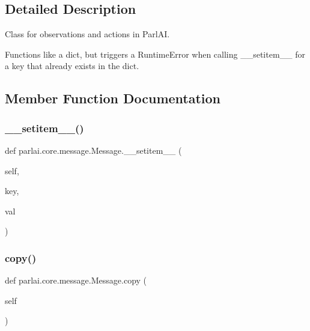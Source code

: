 \subsection{Detailed Description}
\begin{DoxyVerb}Class for observations and actions in ParlAI.

Functions like a dict, but triggers a RuntimeError when calling __setitem__ for a
key that already exists in the dict.
\end{DoxyVerb}
 

\subsection{Member Function Documentation}
\mbox{\label{classparlai_1_1core_1_1message_1_1Message_a2fd83603b06a7da7ab7fc99649d855f6}} 
\subsubsection{\texorpdfstring{\+\_\+\+\_\+setitem\+\_\+\+\_\+()}{\_\_setitem\_\_()}}
{\footnotesize\ttfamily def parlai.\+core.\+message.\+Message.\+\_\+\+\_\+setitem\+\_\+\+\_\+ (\begin{DoxyParamCaption}\item[{}]{self,  }\item[{}]{key,  }\item[{}]{val }\end{DoxyParamCaption})}

\mbox{\label{classparlai_1_1core_1_1message_1_1Message_a374ac4a5d73e853960cc0f964b73a7fd}} 
\subsubsection{\texorpdfstring{copy()}{copy()}}
{\footnotesize\ttfamily def parlai.\+core.\+message.\+Message.\+copy (\begin{DoxyParamCaption}\item[{}]{self }\end{DoxyParamCaption})}

